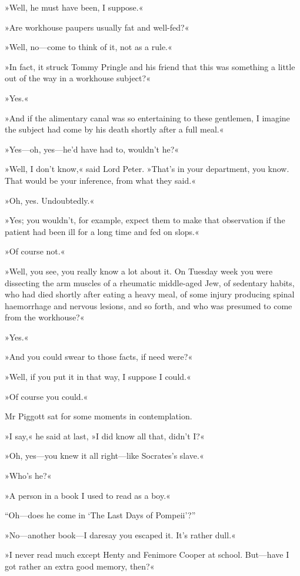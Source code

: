 »Well, he must have been, I suppose.«

»Are workhouse paupers usually fat and well-fed?«

»Well, no—come to think of it, not as a rule.«

»In fact, it struck Tommy Pringle and his friend that this was something a little out of the way in a workhouse subject?«

»Yes.«

»And if the alimentary canal was so entertaining to these gentlemen, I imagine the subject had come by his death shortly after a full meal.«

»Yes—oh, yes—he'd have had to, wouldn't he?«

»Well, I don't know,« said Lord Peter. »That's in your department, you know. That would be your inference, from what they said.«

»Oh, yes. Undoubtedly.«

»Yes; you wouldn't, for example, expect them to make that observation if the patient had been ill for a long time and fed on slops.«

»Of course not.«

»Well, you see, you really know a lot about it. On Tuesday week you were dissecting the arm muscles of a rheumatic middle-aged Jew, of sedentary habits, who had died shortly after eating a heavy meal, of some injury producing spinal haemorrhage and nervous lesions, and so forth, and who was presumed to come from the workhouse?«

»Yes.«

»And you could swear to those facts, if need were?«

»Well, if you put it in that way, I suppose I could.«

»Of course you could.«

Mr Piggott sat for some moments in contemplation.

»I say,« he said at last, »I did know all that, didn't I?«

»Oh, yes—you knew it all right—like Socrates's slave.«

»Who's he?«

»A person in a book I used to read as a boy.«

“Oh—does he come in ‘The Last Days of Pompeii'?”

»No—another book—I daresay you escaped it. It's rather dull.«

»I never read much except Henty and Fenimore Cooper at school\textellipsis . But—have I got rather an extra good memory, then?«

